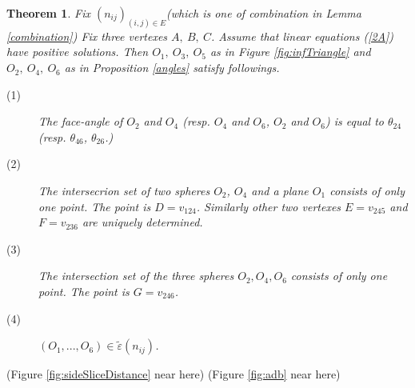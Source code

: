 \documentclass[suppldata, dvipdfmx]{interact}
\theoremstyle{plain}%
\newtheorem{theorem}{Theorem}[section]
\theoremstyle{definition}
\theoremstyle{remark}
\theoremstyle{problemstyle}
\begin{document}
\begin{theorem}\label{compat}
 Fix $(n_{ij})_{(i, j)\in E}$(which is one of combination in Lemma
 \ref{combination})
 Fix three vertexes $A,~B,~C$. Assume that linear equations (\ref{2A}) have
 positive solutions. Then $O_1,~O_3,~O_5$ as in Figure \ref{fig:infTriangle} and
 $O_2,~O_4,~O_6$ as in Proposition \ref{angles} satisfy followings.
 \begin{description}
  \item[(1)] The face-angle of $O_2$ and $O_4$ (resp. $O_4$ and $O_6$,
             $O_2$ and $O_6$) is equal to $\theta_{24}$
             (resp. $\theta_{46}$, $\theta_{26}$.)
  \item[(2)] The intersecrion set of two spheres $O_2$, $O_4$ and a plane
             $O_1$ consists of only one point. The point is 
             $D = v_{124}$. Similarly other two vertexes $E = v_{245}$
             and $F = v_{236}$ are uniquely determined.
  \item[(3)] The intersection set of the three spheres $O_2, O_4, O_6$
             consists of only one point. The point is $G = v_{246}$.
             
  \item[(4)] $(O_1, ..., O_6) \in \tilde\varepsilon(n_{ij})$.
\end{description}
\end{theorem}

\noindent(Figure \ref{fig:sideSliceDistance} near here)
(Figure \ref{fig:adb} near here)
\end{document}
